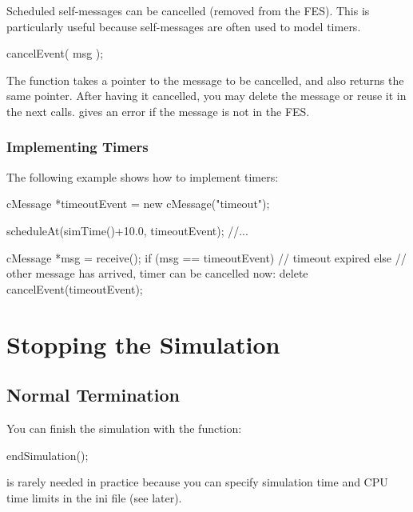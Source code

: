 Scheduled self-messages can be cancelled
 (removed from the FES).
This is particularly useful because self-messages are often used
to model timers.

\begin{cpp}
cancelEvent( msg );
\end{cpp}

The  function takes a pointer to the message to
be cancelled, and also returns the same pointer. After having it
cancelled, you may delete the message or reuse it in the next
 calls.  gives an error if
the message is not in the FES.


\subsubsection{Implementing Timers}

The following example shows how to implement timers:

\begin{cpp}
cMessage *timeoutEvent = new cMessage("timeout");

scheduleAt(simTime()+10.0, timeoutEvent);
//...

cMessage *msg = receive();
if (msg == timeoutEvent)
{
  // timeout expired
}
else
{
  // other message has arrived, timer can be cancelled now:
  delete cancelEvent(timeoutEvent);
}
\end{cpp}





\section{Stopping the Simulation}
\label{sec:simple-modules:stopping}

\subsection{Normal Termination}

You can finish the simulation with the  function:

\begin{cpp}
endSimulation();
\end{cpp}

 is rarely needed in practice because you
can specify simulation time and CPU time limits
in the ini file (see later).

